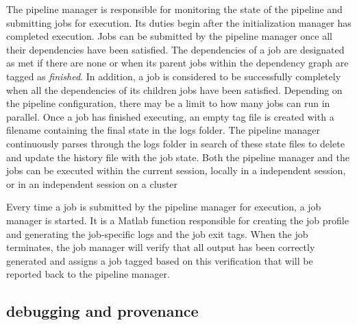 \documentclass{report}
\begin{document}
        The pipeline manager is responsible for monitoring the state of the
        pipeline and submitting jobs for execution. Its duties begin after the
        initialization manager has completed execution. Jobs can be submitted by
        the pipeline manager once all their dependencies have been satisfied.
        The dependencies of a job are designated as met if there are none or
        when its parent jobs within the dependency graph are tagged as
        \textit{finished}. In addition, a job is considered to be successfully
        completely when all the dependencies of its children jobs have been
        satisfied. Depending on the pipeline configuration, there may be a limit
        to how many jobs can run in parallel. Once a job has finished executing,
        an empty tag file is created with a filename containing the final state
        in the logs folder. The pipeline manager continuously parses through the
        logs folder in search of these state files to delete and update the
        history file with the job state. Both the pipeline manager and the jobs
        can be executed within the current session, locally in a independent
        session, or in an independent session on a cluster

        
        Every time a job is submitted by the pipeline manager for execution, a
        job manager is started. It is a Matlab function responsible for creating
        the job profile and generating the job-specific logs and the job exit
        tags. When the job terminates, the job manager will verify that all
        output has been correctly generated and assigns a job tagged based on
        this verification that will be reported back to the pipeline manager.

        \subsection{debugging and provenance}
\end{document}
